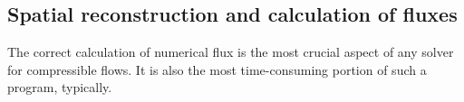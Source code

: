 \documentclass[]{article}
\begin{document}

    \subsection{Spatial reconstruction and calculation of fluxes}

        The correct calculation of numerical flux is the most crucial aspect of
        any solver for compressible flows. It is also the most time-consuming
        portion of such a program, typically.
\end{document}
